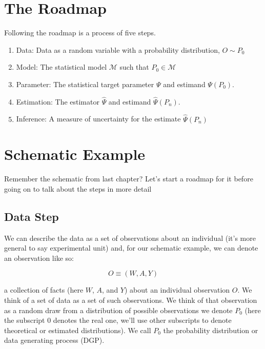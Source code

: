 \documentclass[
  12pt, krantz2,
]{krantz}
\providecommand{\tightlist}{%
  \setlength{\itemsep}{0pt}\setlength{\parskip}{0pt}}
\theoremstyle{definition}
\theoremstyle{definition}
\theoremstyle{definition}
\newcommand{\1}{\mathbbm{1}}
\begin{document}
\hypertarget{the-roadmap}{%
\section{The Roadmap}\label{the-roadmap}}

Following the roadmap is a process of five steps.

\begin{enumerate}
\def\labelenumi{\arabic{enumi}.}
\tightlist
\item
  Data: Data as a random variable with a probability distribution, \(O\sim P_0\)
\item
  Model: The statistical model \(\mathcal{M}\) such that \(P_0 \in \mathcal{M}\)
\item
  Parameter: The statistical target parameter \(\Psi\) and estimand \(\Psi(P_0)\).
\item
  Estimation: The estimator \(\hat{\Psi}\) and estimand \(\hat{\Psi}(P_n)\).
\item
  Inference: A measure of uncertainty for the estimate \(\hat{\Psi}(P_n)\)
\end{enumerate}

\hypertarget{schematic-example}{%
\section{Schematic Example}\label{schematic-example}}

Remember the schematic from last chapter? Let's start a roadmap for it before going on to talk about the steps in more detail

\hypertarget{data-step}{%
\subsection{Data Step}\label{data-step}}

We can describe the data as a set of observations about an individual (it's more general to say experimental unit) and, for our schematic example, we can denote an observation like so:

\[O \equiv (W,A,Y)\]

a collection of facts (here \(W\), \(A\), and \(Y\)) about an individual observation \(O\). We think of a set of data as a set of such observations. We think of that observation as a random draw from a distribution of possible observations we denote \(P_0\) (here the subscript \(0\) denotes the real one, we'll use other subscripts to denote theoretical or estimated distributions). We call \(P_0\) the probability distribution or data generating process (DGP).
\end{document}
